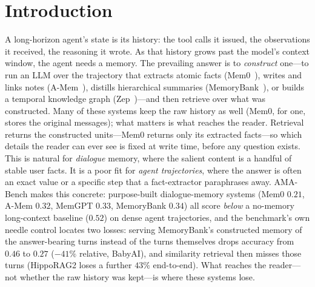 \documentclass{article} %
\begin{document}
\section{Introduction}
\label{sec:intro}

A long-horizon agent's state is its history: the tool calls it issued, the
observations it received, the reasoning it wrote. As that history grows past the
model's context window, the agent needs a memory. The prevailing answer is to
\emph{construct} one---to run an LLM over the trajectory that extracts atomic
facts (Mem0~\citep{mem0}), writes and links notes (A-Mem~\citep{amem}), distills
hierarchical summaries (MemoryBank~\citep{memorybank}), or builds a temporal
knowledge graph (Zep~\citep{zep})---and then retrieve over what was constructed. Many of these systems keep the raw history as well (Mem0, for one, stores the original messages); what matters is what reaches the reader. Retrieval returns the constructed units---Mem0 returns only its extracted facts---so which details the reader can ever see is fixed at write time, before any question exists.
This is natural for \emph{dialogue} memory, where the salient
content is a handful of stable user facts. It is a poor fit for \emph{agent
trajectories}, where the answer is often an exact value or a specific step that a
fact-extractor paraphrases away. AMA-Bench
\citep{amabench} makes this concrete: purpose-built dialogue-memory systems
(Mem0 $0.21$, A-Mem $0.32$, MemGPT $0.33$, MemoryBank $0.34$) all score
\emph{below} a no-memory long-context baseline ($0.52$) on dense agent
trajectories, and the benchmark's own needle control locates two losses: serving MemoryBank's constructed memory of the answer-bearing turns instead of the turns themselves drops accuracy from $0.46$ to $0.27$ ($-41\%$ relative, BabyAI), and similarity retrieval then misses those turns (HippoRAG2 loses a further $43\%$ end-to-end). What reaches the reader---not whether the raw history was kept---is where these systems lose.
\end{document}
